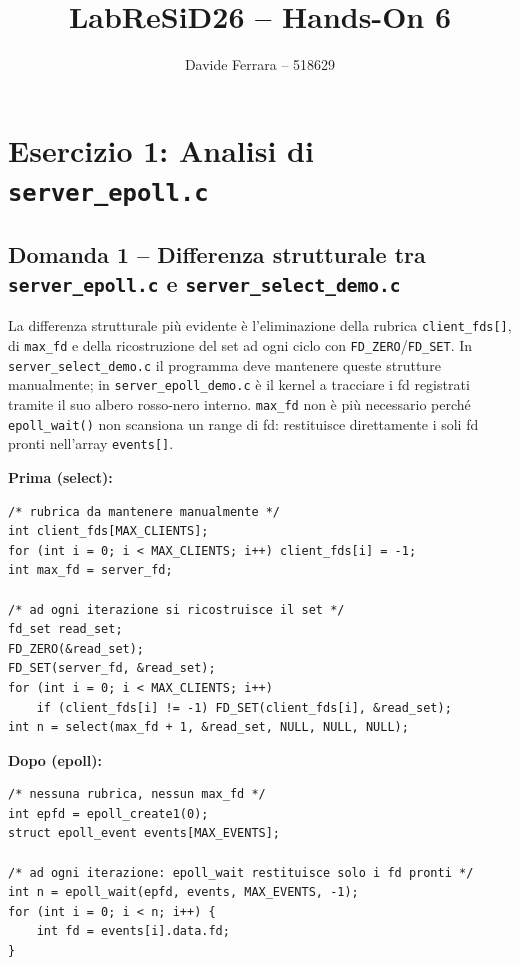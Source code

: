 \documentclass[a4paper,12pt]{article}
\title{LabReSiD26 -- Hands-On 6}
\author{Davide Ferrara -- 518629}
\date{}
\begin{document}
\maketitle

\section{Esercizio 1: Analisi di \texttt{server\_epoll.c}}

\subsection*{Domanda 1 -- Differenza strutturale tra \texttt{server\_epoll.c} e \texttt{server\_select\_demo.c}}

La differenza strutturale più evidente è l'eliminazione della rubrica \texttt{client\_fds[]},
di \texttt{max\_fd} e della ricostruzione del set ad ogni ciclo con
\texttt{FD\_ZERO}/\texttt{FD\_SET}. In \texttt{server\_select\_demo.c} il programma
deve mantenere queste strutture manualmente; in \texttt{server\_epoll\_demo.c} è il
kernel a tracciare i fd registrati tramite il suo albero rosso-nero interno.
\texttt{max\_fd} non è più necessario perché \texttt{epoll\_wait()} non scansiona un
range di fd: restituisce direttamente i soli fd pronti nell'array
\texttt{events[]}.

\medskip
\noindent\textbf{Prima (select):}
\begin{lstlisting}
/* rubrica da mantenere manualmente */
int client_fds[MAX_CLIENTS];
for (int i = 0; i < MAX_CLIENTS; i++) client_fds[i] = -1;
int max_fd = server_fd;

/* ad ogni iterazione si ricostruisce il set */
fd_set read_set;
FD_ZERO(&read_set);
FD_SET(server_fd, &read_set);
for (int i = 0; i < MAX_CLIENTS; i++)
    if (client_fds[i] != -1) FD_SET(client_fds[i], &read_set);
int n = select(max_fd + 1, &read_set, NULL, NULL, NULL);
\end{lstlisting}

\noindent\textbf{Dopo (epoll):}
\begin{lstlisting}
/* nessuna rubrica, nessun max_fd */
int epfd = epoll_create1(0);
struct epoll_event events[MAX_EVENTS];

/* ad ogni iterazione: epoll_wait restituisce solo i fd pronti */
int n = epoll_wait(epfd, events, MAX_EVENTS, -1);
for (int i = 0; i < n; i++) {
    int fd = events[i].data.fd;
}
\end{lstlisting}
\end{document}
